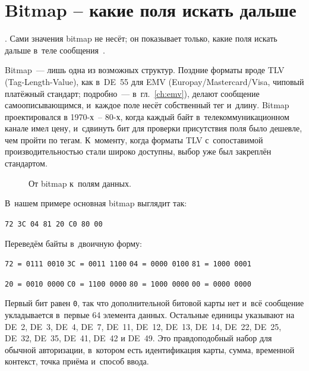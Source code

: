 \section{Bitmap -- какие поля искать дальше}\label{sec:iso8583-bitmap}

.
Сами значения bitmap не несёт; он показывает только, какие поля искать дальше в~теле сообщения~\cite{fis-iso8583-guide-2023}.

Bitmap~--- лишь одна из возможных структур. Поздние форматы вроде TLV (Tag-Length-Value), как в~DE~55 для EMV (Europay/Mastercard/Visa, чиповый платёжный стандарт; подробно~--- в~гл.~\ref{ch:emv}), делают сообщение самоописывающимся, и~каждое поле несёт собственный тег и~длину.
Bitmap проектировался в 1970-х~-- 80-х, когда каждый байт в~телекоммуникационном канале имел цену, и~сдвинуть бит для проверки присутствия поля было дешевле, чем пройти по тегам. К~моменту, когда форматы TLV с~сопоставимой производительностью стали широко доступны, выбор уже был закреплён стандартом.

\begin{figure}[tbp]
  \centering
  \caption{От bitmap к~полям данных.}\label{fig:bitmap-to-fields}
\end{figure}

В~нашем примере основная bitmap выглядит так:

\begin{center}
  \texttt{72 3C 04 81 20 C0 80 00}
\end{center}

Переведём байты в~двоичную форму:

\begin{center}
  \small
  \texttt{72 = 0111\,0010} \quad
  \texttt{3C = 0011\,1100} \quad
  \texttt{04 = 0000\,0100} \quad
  \texttt{81 = 1000\,0001}

  \texttt{20 = 0010\,0000} \quad
  \texttt{C0 = 1100\,0000} \quad
  \texttt{80 = 1000\,0000} \quad
  \texttt{00 = 0000\,0000}
\end{center}

Первый бит равен \texttt{0}, так что дополнительной битовой карты нет и~всё сообщение укладывается в~первые 64 элемента данных. Остальные единицы указывают на DE~2, DE~3, DE~4, DE~7, DE~11, DE~12, DE~13, DE~14, DE~22, DE~25, DE~32, DE~35, DE~41, DE~42 и DE~49.
Это правдоподобный набор для обычной авторизации, в~котором есть идентификация карты, сумма, временной контекст, точка приёма и~способ ввода.

